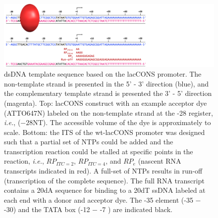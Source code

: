 \begin{figure}
    \centering
    \includegraphics[width=1.5\textwidth]{chapters/figures/ds-lacCONS-seq.jpg}
    \caption{\label{fig:ds-lacCONS_seq} 
    \ac{dsDNA} template sequence based on the \ac{lacCONS} promoter.
    The non-template strand is presented in the 5' - 3' direction (blue), and the complementary template strand is presented the 3' - 5' direction (magenta).
    Top: lacCONS construct with an example acceptor dye (ATTO647N) labeled on the non-template strand at the -28 register, \textit{i.e.}, ($-28$NT). 
    The accessible volume of the dye is approximately to scale.
    Bottom: the \ac{ITS} of the wt-\ac{lacCONS} promoter was designed such that a partial set of \ac{NTP}s could be added and the transcription reaction could be stalled at specific points in the reaction, \textit{i.e.}, $RP_{ITC=2}$, $RP_{ITC=4}$, and $RP_{e}$ (nascent RNA transcripts indicated in red).
    A full-set of \ac{NTP}s results in run-off (transcription of the complete sequence).
    The full RNA transcript contains a 20dA sequence for binding to a 20dT \ac{ssDNA} labeled at each end with a donor and acceptor dye.
    The -35 element (-35 $-$ -30) and the TATA box (-12 $-$ -7 ) are indicated black.
    }
\end{figure}

